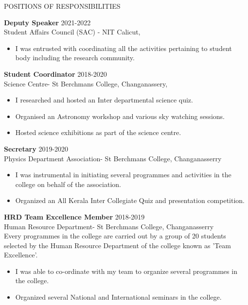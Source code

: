 \documentclass{resume} %
\begin{document}
\begin{rSection}{POSITIONS OF RESPONSIBILITIES}
	
	\textbf{Deputy Speaker } \hfill 2021-2022\\
	Student Affairs Council (SAC) - NIT Calicut,
	\begin{itemize}[noitemsep,topsep=-0.2cm]
		\itemsep-0.25cm
		\item I was entrusted with coordinating all the activities pertaining to student body including the research community. 
	\end{itemize}
	
	\textbf{Student Coordinator  } \hfill 2018-2020\\
	Science Centre- St Berchmans College, Changanassery,
	\begin{itemize}[noitemsep,topsep=-0.2cm]
		\itemsep-0.05cm
		\item I researched and hosted an Inter departmental science quiz. 
		\item Organised an Astronomy workshop and various sky watching sessions. 
		\item Hosted science exhibitions as part of the science centre. 
	\end{itemize}
	
	\textbf{Secretary} \hfill 2019-2020\\
	Physics Department Association- St Berchmans College, Changanasserry 
	\begin{itemize}[noitemsep,topsep=-0.2cm]
		\itemsep-0.05cm
		\item I was instrumental in initiating several programmes and activities in the college on behalf of the association. 
		\item Organized an All Kerala Inter Collegiate Quiz and presentation competition. 
	\end{itemize}

	
	\textbf{HRD Team Excellence Member } \hfill 2018-2019\\
	Human Resource Department- St Berchmans College, Changanasserry \\
	Every programmes in the college are carried out by a group of 20 students selected by the Human Resource Department of the college known as 'Team Excellence'. 
	\begin{itemize}[noitemsep,topsep=-0.2cm]
		\itemsep-0.05cm
		\item I was able to co-ordinate with my team to organize several programmes in the college. 
		\item Organized several National and International seminars in the college. 
	\end{itemize}
\end{rSection}
\end{document}
